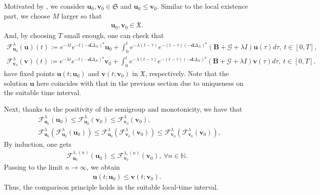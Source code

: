 \documentclass[a4paper,11pt]{amsart}
\theoremstyle{definition}
\def\N{\mathbb{N}}
\numberwithin{equation}{section}
\theoremstyle{definition}
\begin{document}
Motivated by \cite[Theorem 4.5]{magal_monotone_2019}, we consider $\textbf{u}_0,\textbf{v}_0\in \mathfrak{S}$ and $\textbf{u}_0\leq \textbf{v}_0$. Similar to the local existence part, we choose $M$ larger so that 
\begin{align*}
\textbf{u}_0,\textbf{v}_0\in \mathfrak{X}.
\end{align*}
And, by choosing $T$ small enough, one can check that 
\begin{align*}
\mathcal{F}_{\textbf{u}_0}^{\lambda}(\textbf{u})(t):=e^{-\lambda t}e^{-t(-\textbf{d}\Delta_N)^\textbf{s}}\textbf{u}_0+\int_0^t e^{-\lambda (t-\tau)}e^{-(t-\tau)(-\textbf{d}\Delta_N)^\textbf{s}}\left(\mathbf{B}+\mathcal{G}+\lambda I\right)\textbf{u}(\tau)d\tau,~t\in [0,T],\\
\mathcal{F}_{\textbf{v}_0}^{\lambda}(\textbf{v})(t):=e^{-\lambda t}e^{-t(-\textbf{d}\Delta_N)^\textbf{s}}\textbf{v}_0+\int_0^te^{-\lambda (t-\tau)}e^{-(t-\tau)(-\textbf{d}\Delta_N)^\textbf{s}}\left(\mathbf{B}+\mathcal{G}+\lambda I\right)\textbf{v}(\tau)d\tau,~t\in [0,T],
\end{align*}
have fixed points $\textbf{u}(t;\textbf{u}_0)$ and $\textbf{v}(t;\textbf{v}_0)$ in $\mathfrak{X}$, respectively. Note that the solution $\textbf{u}$ here coincides with that in the previous section due to uniqueness on the suitable time interval. 

Next, thanks to the positivity of the semigroup and monotonicity, we have that
\begin{align*}
&\mathcal{F}_{\textbf{u}_0}^{\lambda}(\textbf{u}_0)\leq \mathcal{F}^{\lambda}_{\textbf{u}_0}(\textbf{v}_0) \leq \mathcal{F}^{\lambda}_{\textbf{v}_0}(\textbf{v}_0) ,\\
&\mathcal{F}^{\lambda}_{\textbf{u}_0}(\mathcal{F}^{\lambda}_{\textbf{u}_0}(\textbf{u}_0)) \leq \mathcal{F}^{\lambda}_{\textbf{u}_0}(\mathcal{F}^{\lambda}_{\textbf{v}_0}(\textbf{v}_0)) \leq \mathcal{F}^{\lambda}_{\textbf{v}_0}(\mathcal{F}^{\lambda}_{\textbf{v}_0}(\textbf{v}_0)),
\end{align*}
By induction, one gets
\begin{align*}
\mathcal{F}_{\textbf{u}_0}^{\lambda,(n)}(\textbf{u}_0) \leq \mathcal{F}_{\textbf{v}_0}^{\lambda,(n)}(\textbf{v}_0),~\forall n \in \N.
\end{align*}
Passing to the limit $n\rightarrow \infty$, we obtain
\begin{align*}
\textbf{u}(t;\textbf{u}_0)\leq \textbf{v}(t;\textbf{v}_0).
\end{align*}
Thus, the comparison principle holds in the suitable local-time interval.
\end{document}
